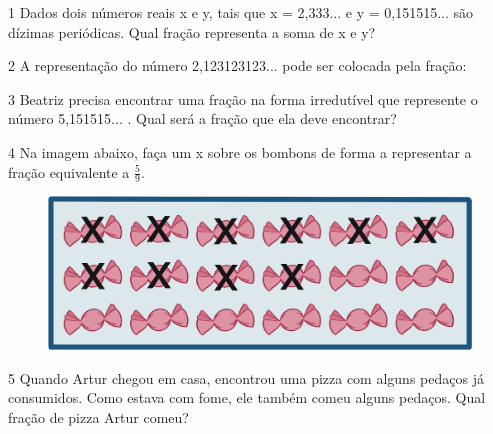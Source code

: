 \num{1} Dados dois números reais x e y, tais que x = 2,333... e y =
0,151515... são dízimas periódicas. Qual fração representa a soma de x
e y?

\begin{emptybox}
\vspace{1cm}
\end{emptybox}

\num{2} A representação do número 2,123123123... pode ser colocada pela
fração:

\begin{emptybox}
\vspace{1cm}
\end{emptybox}

\num{3} Beatriz precisa encontrar uma fração na forma irredutível que
represente o número 5,151515... . Qual será a fração que ela deve
encontrar?

\begin{emptybox}
\vspace{1cm}
\end{emptybox}

\pagebreak
\num{4} Na imagem abaixo, faça um x sobre os bombons de forma a
representar a fração equivalente a $\frac{5}{9}$.

\begin{figure}[htpb!]
\centering
\includegraphics[width=\textwidth]{./ilustras-mat/modulo_3-atividade_4_resposta.png}
\end{figure}

\num{5} Quando Artur chegou em casa, encontrou uma pizza com alguns pedaços
já consumidos. Como estava com fome, ele também comeu alguns pedaços.
Qual fração de pizza Artur comeu?

